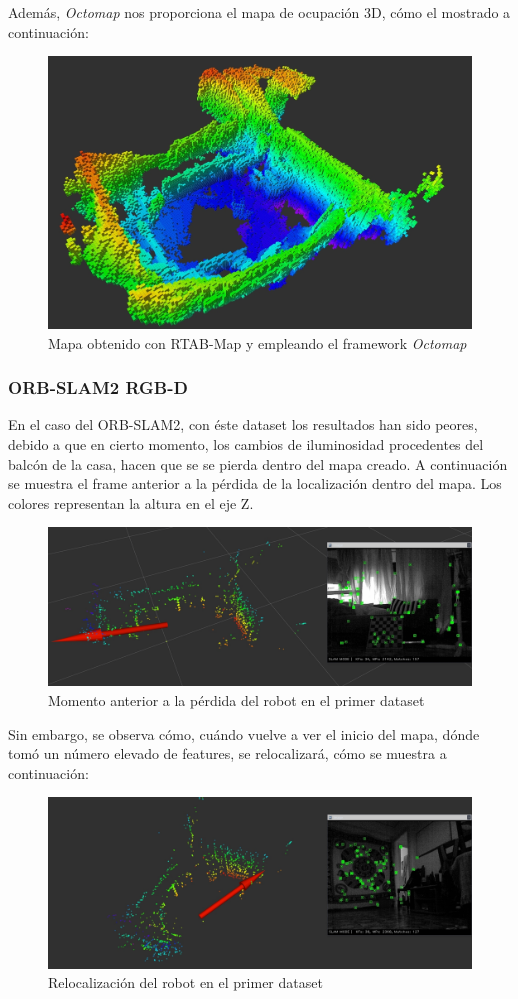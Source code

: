 Además, \textit{Octomap} nos proporciona el mapa de ocupación 3D, cómo el mostrado a continuación:
\begin{figure}[h!]
    \centering
    \includegraphics[width=.9\textwidth]{images/slam/bag1_octomap_LC}
    \caption{Mapa obtenido con RTAB-Map y empleando el framework \textit{Octomap}}
\end{figure}
\subsubsection{ORB-SLAM2 RGB-D}
En el caso del ORB-SLAM2, con éste dataset los resultados han sido peores, debido a que en cierto momento, los cambios de iluminosidad procedentes del balcón de la casa, hacen que se
se pierda dentro del mapa creado. A continuación se muestra el frame anterior a la pérdida de la localización dentro del mapa. Los colores representan la altura en el eje Z.
\begin{figure}[h!]
    \centering
    \includegraphics[width=.9\textwidth]{images/slam/bag1_orb_beforeLOSE}
    \caption{Momento anterior a la pérdida del robot en el primer dataset}
\end{figure}

Sin embargo, se observa cómo, cuándo vuelve a ver el inicio del mapa, dónde tomó un número elevado de features, se relocalizará, cómo se muestra a continuación:
\begin{figure}[h!]
    \centering
    \includegraphics[width=.9\textwidth]{images/slam/bag1_orb_relocal}
    \caption{Relocalización del robot en el primer dataset}
\end{figure}
\newpage
